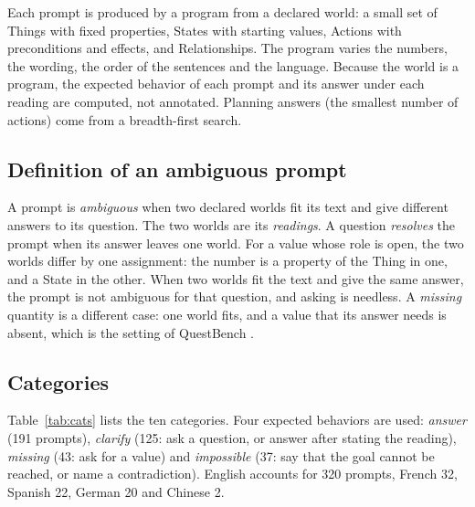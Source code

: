 \documentclass[11pt,a4paper]{article}
\begin{document}
Each prompt is produced by a program from a declared world: a small set of
Things with fixed properties, States with starting values, Actions with
preconditions and effects, and Relationships. The program varies the
numbers, the wording, the order of the sentences and the language. Because
the world is a program, the expected behavior of each prompt and its
answer under each reading are computed, not annotated. Planning answers
(the smallest number of actions) come from a breadth-first search.

\subsection{Definition of an ambiguous prompt}

A prompt is \emph{ambiguous} when two declared worlds fit its text and
give different answers to its question. The two worlds are its
\emph{readings}. A question \emph{resolves} the prompt when its answer
leaves one world. For a value whose role is open, the two worlds differ by
one assignment: the number is a property of the Thing in one, and a State
in the other. When two worlds fit the text and give the same answer, the
prompt is not ambiguous for that question, and asking is needless. A
\emph{missing} quantity is a different case: one world fits, and a value
that its answer needs is absent, which is the setting of QuestBench
\cite{li2025questbench}.

\subsection{Categories}

Table~\ref{tab:cats} lists the ten categories. Four expected behaviors
are used: \emph{answer} (191 prompts), \emph{clarify} (125: ask a
question, or answer after stating the reading), \emph{missing} (43: ask
for a value) and \emph{impossible} (37: say that the goal cannot be
reached, or name a contradiction). English accounts for 320 prompts,
French 32, Spanish 22, German 20 and Chinese 2.
\end{document}
